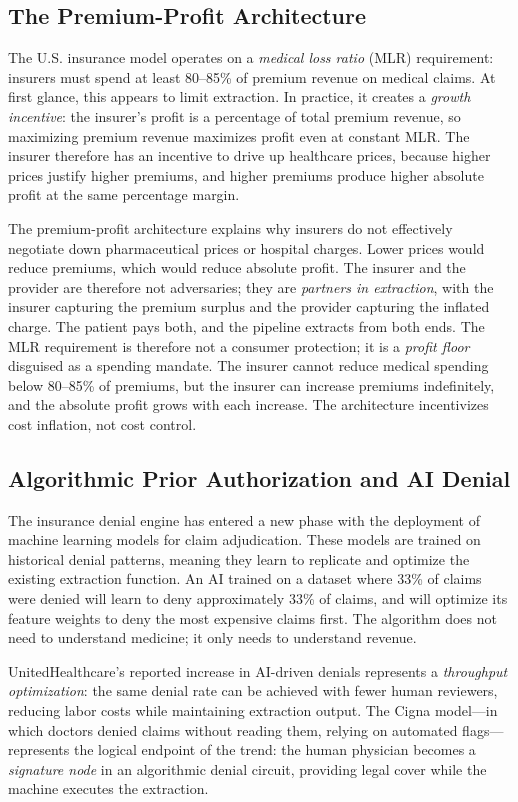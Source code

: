 \subsection{The Premium-Profit Architecture}

The U.S. insurance model operates on a \textit{medical loss ratio} (MLR) requirement: insurers must spend at least 80--85\% of premium revenue on medical claims. At first glance, this appears to limit extraction. In practice, it creates a \textit{growth incentive}: the insurer's profit is a percentage of total premium revenue, so maximizing premium revenue maximizes profit even at constant MLR. The insurer therefore has an incentive to drive up healthcare prices, because higher prices justify higher premiums, and higher premiums produce higher absolute profit at the same percentage margin.

The premium-profit architecture explains why insurers do not effectively negotiate down pharmaceutical prices or hospital charges. Lower prices would reduce premiums, which would reduce absolute profit. The insurer and the provider are therefore not adversaries; they are \textit{partners in extraction}, with the insurer capturing the premium surplus and the provider capturing the inflated charge. The patient pays both, and the pipeline extracts from both ends. The MLR requirement is therefore not a consumer protection; it is a \textit{profit floor} disguised as a spending mandate. The insurer cannot reduce medical spending below 80--85\% of premiums, but the insurer can increase premiums indefinitely, and the absolute profit grows with each increase. The architecture incentivizes cost inflation, not cost control.

\subsection{Algorithmic Prior Authorization and AI Denial}

The insurance denial engine has entered a new phase with the deployment of machine learning models for claim adjudication. These models are trained on historical denial patterns, meaning they learn to replicate and optimize the existing extraction function. An AI trained on a dataset where 33\% of claims were denied will learn to deny approximately 33\% of claims, and will optimize its feature weights to deny the most expensive claims first. The algorithm does not need to understand medicine; it only needs to understand revenue.

UnitedHealthcare's reported increase in AI-driven denials represents a \textit{throughput optimization}: the same denial rate can be achieved with fewer human reviewers, reducing labor costs while maintaining extraction output. The Cigna model---in which doctors denied claims without reading them, relying on automated flags---represents the logical endpoint of the trend: the human physician becomes a \textit{signature node} in an algorithmic denial circuit, providing legal cover while the machine executes the extraction.

